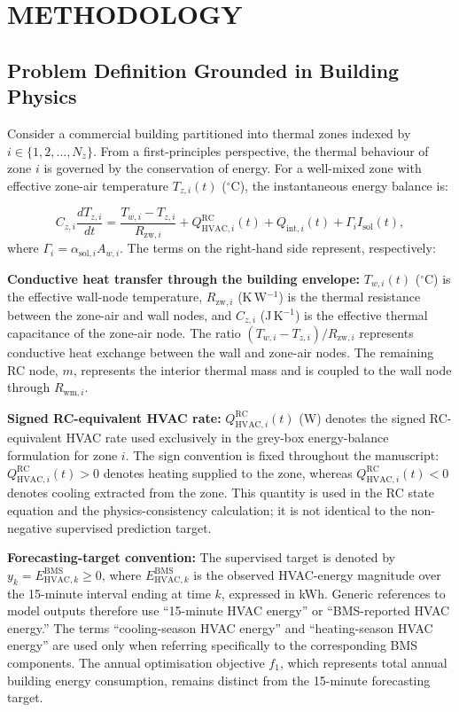 \documentclass[11pt]{article}
\newcommand{\degree}{\ensuremath{^\circ}}
\begin{document}
\section{METHODOLOGY}

\subsection{Problem Definition Grounded in Building Physics}

Consider a commercial building partitioned into thermal zones indexed by $i \in \{1, 2, \ldots, N_z\}$. From a first-principles perspective, the thermal behaviour of zone $i$ is governed by the conservation of energy. For a well-mixed zone with effective zone-air temperature $T_{z,i}(t)$ (\degree C), the instantaneous energy balance is:

\begin{equation}
C_{z,i}\frac{dT_{z,i}}{dt}
=
\frac{T_{w,i}-T_{z,i}}{R_{\mathrm{zw},i}}
+
Q_{\mathrm{HVAC},i}^{\mathrm{RC}}(t)
+
Q_{\mathrm{int},i}(t)
+
\Gamma_i I_{\mathrm{sol}}(t),
\label{eq:rc_zone_balance}
\end{equation}
where $\Gamma_i=\alpha_{\mathrm{sol},i}A_{w,i}$. The terms on the right-hand side represent, respectively:

\textbf{Conductive heat transfer through the building envelope:} $T_{w,i}(t)$ (\degree C) is the effective wall-node temperature, $R_{\mathrm{zw},i}$ (K\,W$^{-1}$) is the thermal resistance between the zone-air and wall nodes, and $C_{z,i}$ (J\,K$^{-1}$) is the effective thermal capacitance of the zone-air node. The ratio $(T_{w,i}-T_{z,i})/R_{\mathrm{zw},i}$ represents conductive heat exchange between the wall and zone-air nodes. The remaining RC node, $m$, represents the interior thermal mass and is coupled to the wall node through $R_{\mathrm{wm},i}$.

\textbf{Signed RC-equivalent HVAC rate:} $Q_{\mathrm{HVAC},i}^{\mathrm{RC}}(t)$ (W) denotes the signed RC-equivalent HVAC rate used exclusively in the grey-box energy-balance formulation for zone $i$. The sign convention is fixed throughout the manuscript: $Q_{\mathrm{HVAC},i}^{\mathrm{RC}}(t)>0$ denotes heating supplied to the zone, whereas $Q_{\mathrm{HVAC},i}^{\mathrm{RC}}(t)<0$ denotes cooling extracted from the zone. This quantity is used in the RC state equation and the physics-consistency calculation; it is not identical to the non-negative supervised prediction target.

\textbf{Forecasting-target convention:} The supervised target is denoted by $y_k=E_{\mathrm{HVAC},k}^{\mathrm{BMS}}\geq0$, where $E_{\mathrm{HVAC},k}^{\mathrm{BMS}}$ is the observed HVAC-energy magnitude over the 15-minute interval ending at time $k$, expressed in kWh. Generic references to model outputs therefore use ``15-minute HVAC energy'' or ``BMS-reported HVAC energy.'' The terms ``cooling-season HVAC energy'' and ``heating-season HVAC energy'' are used only when referring specifically to the corresponding BMS components. The annual optimisation objective $f_1$, which represents total annual building energy consumption, remains distinct from the 15-minute forecasting target.
\end{document}
